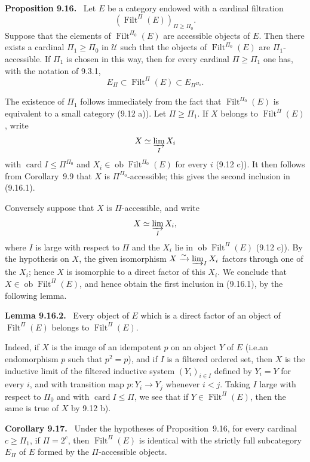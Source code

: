 \documentclass[11pt]{article}
\newcommand{\U}{\mathcal{U}}
\newcommand{\ob}{\operatorname{ob}}
\newcommand{\Filt}{\operatorname{Filt}}
\newcommand{\card}{\operatorname{card}}
\newcommand{\ie}{i.e.}
\newcommand{\xto}[1]{\xrightarrow{#1}}
\newenvironment{statement}[1]{\par\medskip\noindent\textbf{#1.}\ }{\par\medskip}
\begin{document}
\begin{statement}{Proposition 9.16}
Let $E$ be a category endowed with a cardinal filtration
\[
(\Filt^\Pi(E))_{\Pi\geq\Pi_0}.
\]
Suppose that the elements of $\Filt^{\Pi_0}(E)$ are accessible objects of $E$. Then there exists a cardinal $\Pi_1\geq\Pi_0$ in $\U$ such that the objects of $\Filt^{\Pi_0}(E)$ are $\Pi_1$-accessible. If $\Pi_1$ is chosen in this way, then for every cardinal $\Pi\geq\Pi_1$ one has, with the notation of 9.3.1,
\begin{equation}
 E_\Pi\subset \Filt^\Pi(E)\subset E_{\Pi^{\Pi_0}}.
 \tag{9.16.1}
\end{equation}
\end{statement}

The existence of $\Pi_1$ follows immediately from the fact that $\Filt^{\Pi_0}(E)$ is equivalent to a small category (9.12 a)). Let $\Pi\geq\Pi_1$. If $X$ belongs to $\Filt^\Pi(E)$, write
\[
 X\simeq \varinjlim_I X_i
\]
with $\card I\leq\Pi^{\Pi_0}$ and $X_i\in\ob\Filt^{\Pi_0}(E)$ for every $i$ (9.12 c)). It then follows from Corollary~9.9 that $X$ is $\Pi^{\Pi_0}$-accessible; this gives the second inclusion in (9.16.1).

Conversely suppose that $X$ is $\Pi$-accessible, and write
\[
 X\simeq \varinjlim_I X_i,
\]
where $I$ is large with respect to $\Pi$ and the $X_i$ lie in $\ob\Filt^\Pi(E)$ (9.12 c)). By the hypothesis on $X$, the given isomorphism $X\xto{\sim}\varinjlim_I X_i$ factors through one of the $X_i$; hence $X$ is isomorphic to a direct factor of this $X_i$. We conclude that $X\in\ob\Filt^\Pi(E)$, and hence obtain the first inclusion in (9.16.1), by the following lemma.

\begin{statement}{Lemma 9.16.2}
Every object of $E$ which is a direct factor of an object of $\Filt^\Pi(E)$ belongs to $\Filt^\Pi(E)$.
\end{statement}

Indeed, if $X$ is the image of an idempotent $p$ on an object $Y$ of $E$ (\ie an endomorphism $p$ such that $p^2=p$), and if $I$ is a filtered ordered set, then $X$ is the inductive limit of the filtered inductive system $(Y_i)_{i\in I}$ defined by $Y_i=Y$ for every $i$, and with transition map $p:Y_i\to Y_j$ whenever $i<j$. Taking $I$ large with respect to $\Pi_0$ and with $\card I\leq\Pi$, we see that if $Y\in\Filt^\Pi(E)$, then the same is true of $X$ by 9.12 b).

\begin{statement}{Corollary 9.17}
Under the hypotheses of Proposition~9.16, for every cardinal $c\geq\Pi_1$, if $\Pi=2^c$, then $\Filt^\Pi(E)$ is identical with the strictly full subcategory $E_\Pi$ of $E$ formed by the $\Pi$-accessible objects.
\end{statement}
\end{document}

